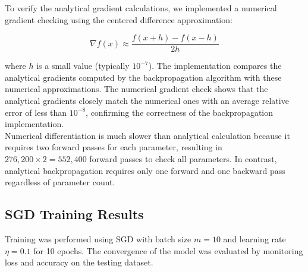 \documentclass{article}
\begin{document}
To verify the analytical gradient calculations, we implemented 
a numerical gradient checking using the centered difference 
approximation:

\begin{equation}
\nabla f(x) \approx \frac{f(x + h) - f(x - h)}{2h}
\end{equation}

\noindent where $h$ is a small value (typically $10^{-7}$). 
The implementation compares the analytical gradients computed 
by the backpropagation algorithm with these numerical approximations. 
The numerical gradient check shows that the analytical gradients closely 
match the numerical ones with an average relative error of less than $10^{-8}$, 
confirming the correctness of the backpropagation implementation. \\

\noindent Numerical differentiation is much slower than analytical calculation because 
it requires two forward passes for each parameter, 
resulting in $276,200 \times 2 = 552,400$ forward passes to check all parameters. 
In contrast, analytical backpropagation requires only one forward and one backward 
pass regardless of parameter count.

\subsection{SGD Training Results}

\noindent Training was performed using SGD with batch size $m=10$ 
and learning rate $\eta=0.1$ for 10 epochs. The convergence 
of the model was evaluated by monitoring loss and accuracy 
on the testing dataset.
\end{document}
